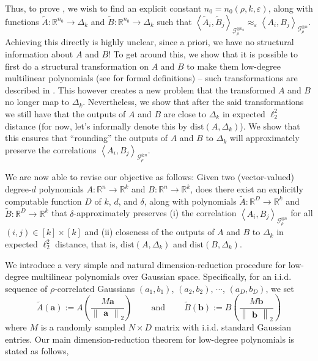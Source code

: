 \documentclass[11pt]{article}
\newcommand{\inparen}[1]{\left ( #1 \right )}
\newcommand{\inangle}[1]{\left \langle #1 \right \rangle}
\newcommand{\norm}[2]{\begin{Vmatrix} #2 \end{Vmatrix}_{#1}}
\newcommand{\sAND}{\ \mathrm{and} \ }
\newcommand{\wtilde}[1]{\widetilde{#1}}
\newcommand{\eps}{\varepsilon}
\newcommand{\bbR}{{\mathbb R}}
\newcommand{\ba}{{\bm a}}
\newcommand{\bb}{{\bm b}}
\newcommand{\calG}{\mathcal{G}}
\begin{document}
Thus, to prove , we wish to find an explicit constant $n_0 = n_0(\rho, k, \eps)$, along with functions $\wtilde{A}: \bbR^{n_0} \to \Delta_k$ and $\wtilde{B}: \bbR^{n_0} \to \Delta_k$ such that $\inangle{\wtilde{A}_i, \wtilde{B}_j}_{\calG_{\rho}^{\otimes n_0}} \approx_\eps \inangle{A_i, B_j}_{\calG_{\rho}^{\otimes n}}$. Achieving this directly is highly unclear, since a priori, we have no structural information about $A$ and $B$! To get around this, we show that it is possible to first do a structural transformation on $A$ and $B$ to make them low-degree multilinear polynomials (see  for formal definitions) -- such transformations are described in . This however creates a new problem that the transformed $A$ and $B$ no longer map to $\Delta_k$. Nevertheless, we show that after the said transformations we still have that the outputs of $A$ and $B$ are close to $\Delta_k$ in expected $\ell_2^2$ distance (for now, let's informally denote this by $\mathrm{dist}(A, \Delta_k)$). We show that this ensures that ``rounding'' the outputs of $A$ and $B$ to $\Delta_k$ will approximately preserve the correlations $\inangle{A_i, B_j}_{\calG_\rho^{\otimes n}}$.

We are now able to revise our objective as follows: Given two (vector-valued) degree-$d$ polynomials $A: \bbR^n \to \bbR^k$ and $B: \bbR^n \to \bbR^k$, does there exist an explicitly computable function $D$ of $k$, $d$, and $\delta$, along with polynomials $\wtilde{A}: \bbR^D \to \bbR^k$ and $\wtilde{B}: \bbR^D \to \bbR^k$ that $\delta$-approximately preserves (i) the correlation $\inangle{A_i, B_j}_{\calG_{\rho}^{\otimes n}}$ for all $(i,j) \in [k] \times [k]$ and (ii) closeness of the outputs of $A$ and $B$ to $\Delta_k$ in expected $\ell_2^2$ distance, that is, $\mathrm{dist}(A, \Delta_k)$ and $\mathrm{dist}(B, \Delta_k)$.

We introduce a very simple and natural dimension-reduction procedure for low-degree multilinear polynomials over Gaussian space. Specifically, for an i.i.d. sequence of $\rho$-correlated Gaussians  $(a_1,b_1)$, $(a_2,b_2)$, $\cdots$, $(a_{D},b_{D})$, we set
\begin{equation}\label{eqn:dim-red-substitution}
\wtilde{A}(\ba) := A\inparen{\frac{M \ba}{\norm{2}{\ba}}} \qquad \sAND \qquad \wtilde{B}(\bb) := B\inparen{\frac{M \bb}{\norm{2}{\bb}}}
\end{equation}
where $M$ is a randomly sampled $N \times D$ matrix with i.i.d. standard Gaussian entries. Our main dimension-reduction theorem for low-degree polynomials is stated as follows,
\end{document}

